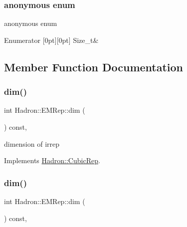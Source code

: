 \subsubsection{\texorpdfstring{anonymous enum}{anonymous enum}}
{\footnotesize\ttfamily anonymous enum}

\begin{DoxyEnumFields}{Enumerator}
[0pt][0pt]{}\mbox{\label{structHadron_1_1EMRep_af34859174c0b8f5f070177b60d296a4da95cfc91bb6a89057579f519ca41a8015}} 
Size\+\_\+t&\\
\hline

\end{DoxyEnumFields}


\subsection{Member Function Documentation}
\mbox{\label{structHadron_1_1EMRep_ae77e0d4cd20a7b659270f04e46f79ad8}} 
\subsubsection{\texorpdfstring{dim()}{dim()}\hspace{0.1cm}{\footnotesize\ttfamily [1/2]}}
{\footnotesize\ttfamily int Hadron\+::\+E\+M\+Rep\+::dim (\begin{DoxyParamCaption}{ }\end{DoxyParamCaption}) const\hspace{0.3cm}{\ttfamily [inline]}, {\ttfamily [virtual]}}

dimension of irrep 

Implements \mbox{\hyperlink{structHadron_1_1CubicRep_ac178d14064f037a66af4b9fb4b312d51}{Hadron\+::\+Cubic\+Rep}}.

\mbox{\label{structHadron_1_1EMRep_ae77e0d4cd20a7b659270f04e46f79ad8}} 
\subsubsection{\texorpdfstring{dim()}{dim()}\hspace{0.1cm}{\footnotesize\ttfamily [2/2]}}
{\footnotesize\ttfamily int Hadron\+::\+E\+M\+Rep\+::dim (\begin{DoxyParamCaption}{ }\end{DoxyParamCaption}) const\hspace{0.3cm}{\ttfamily [inline]}, {\ttfamily [virtual]}}

